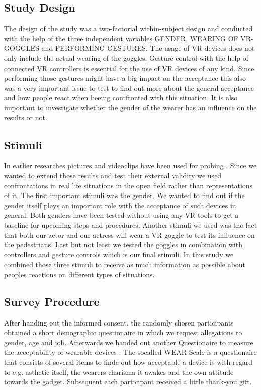 \documentclass[sigchi]{acmart}
\begin{document}
\subsection{Study Design}

The design of the study was a two-factorial within-subject design and conducted with the help of the three independent variables GENDER, WEARING OF VR-GOGGLES and PERFORMING GESTURES. The usage of VR devices does not only include the actual wearing of the goggles. Gesture control with the help of connected VR controllers is essential for the use of VR devices of any kind. Since performing those gestures might have a big impact on the acceptance this also was a very important issue to test to find out more about the general acceptance and how people react when beeing contfronted with this situation. It is also important to investigate whether the gender of the wearer has an influence on the results or not.

\subsection{Stimuli}

In earlier researches pictures and videoclips have been used for probing \cite{schwind2018virtual}. Since we wanted to extend those results and test their external validity we used confrontations in real life situations in the open field rather than representations of it. The first important stimuli was the gender. We wanted to find out if the gender itself plays an important role with the acceptance of such devices in general. Both genders have been tested without using any VR tools to get a baseline for upcoming steps and procedures. Another stimuli we used was the fact that both our actor and our actress will wear a VR goggle to test its influence on the pedestrians. Last but not least we tested the goggles in combination with controllers and gesture controls which is our final stimuli. In this study we combined those three stimuli to receive as much information as possible about peoples reactions on different types of situations.

\subsection{Survey Procedure}

After handing out the informed consent, the randomly chosen participants obtained a short demographic questionaire in which we request allegations to gender, age and job. Afterwards we handed out another Questionaire to measure the acceptability of wearable devices \cite{kelly2016wear}. The socalled WEAR Scale is a questionaire that consists of several items to finde out how acceptable a device is with regard to e.g. asthetic itself, the wearers charisma it awakes and the own attitude towards the gadget. Subsequent each participant received a little thank-you gift.
\end{document}
